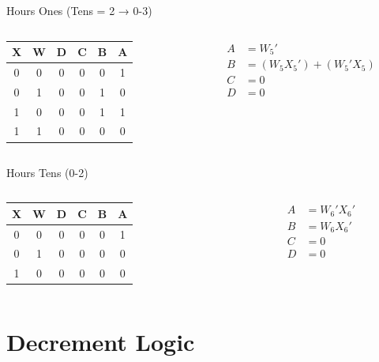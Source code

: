 \documentclass{beamer}
\begin{document}
\begin{frame}{Hours Ones (Tens = 2 → 0-3)}
\begin{columns}
\begin{column}{0.5\textwidth}
\centering
\begin{tabular}{|c|c||c|c|c|c|}
\hline
X & W & D & C & B & A\\
\hline
0&0&0&0&0&1\\
0&1&0&0&1&0\\
1&0&0&0&1&1\\
1&1&0&0&0&0\\
\hline
\end{tabular}
\end{column}
\begin{column}{0.5\textwidth}
\begin{align*}
A &= W_5'\\
B &= (W_5 X_5') + (W_5' X_5)\\
C &= 0\\
D &= 0
\end{align*}
\end{column}
\end{columns}
\end{frame}

\begin{frame}{Hours Tens (0-2)}
\begin{columns}
\begin{column}{0.5\textwidth}
\centering
\begin{tabular}{|c|c||c|c|c|c|}
\hline
X & W & D & C & B & A\\
\hline
0&0&0&0&0&1\\
0&1&0&0&0&0\\
1&0&0&0&0&0\\
\hline
\end{tabular}
\end{column}
\begin{column}{0.5\textwidth}
\begin{align*}
A &= W_6' X_6'\\
B &= W_6 X_6'\\
C &= 0\\
D &= 0
\end{align*}
\end{column}
\end{columns}
\end{frame}

\section{Decrement Logic}
\end{document}
